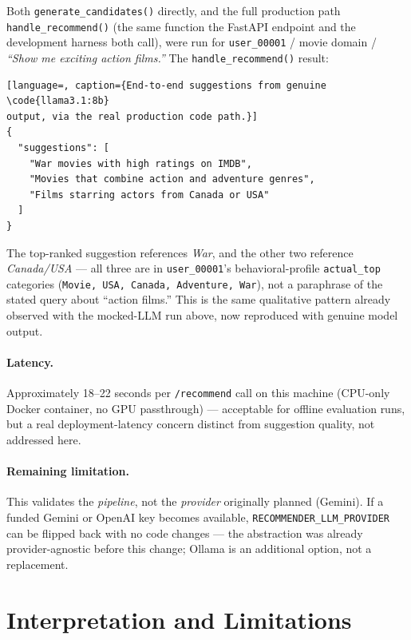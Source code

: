\documentclass[11pt,a4paper]{article}
\newcommand{\code}[1]{\texttt{#1}}
\begin{document}
Both \code{generate\_candidates()} directly, and the full production path
\code{handle\_recommend()} (the same function the FastAPI endpoint and the development harness both
call), were run for \code{user\_00001} / movie domain / \emph{``Show me exciting action films.''}
The \code{handle\_recommend()} result:

\begin{lstlisting}[language=, caption={End-to-end suggestions from genuine \code{llama3.1:8b}
output, via the real production code path.}]
{
  "suggestions": [
    "War movies with high ratings on IMDB",
    "Movies that combine action and adventure genres",
    "Films starring actors from Canada or USA"
  ]
}
\end{lstlisting}

The top-ranked suggestion references \emph{War}, and the other two reference \emph{Canada/USA} ---
all three are in \code{user\_00001}'s behavioral-profile \code{actual\_top} categories (\code{Movie,
USA, Canada, Adventure, War}), not a paraphrase of the stated query about ``action films.'' This is
the same qualitative pattern already observed with the mocked-LLM run above, now reproduced with
genuine model output.

\paragraph{Latency.} Approximately 18--22 seconds per \code{/recommend} call on this machine
(CPU-only Docker container, no GPU passthrough) --- acceptable for offline evaluation runs, but a
real deployment-latency concern distinct from suggestion quality, not addressed here.

\paragraph{Remaining limitation.} This validates the \emph{pipeline}, not the \emph{provider}
originally planned (Gemini). If a funded Gemini or OpenAI key becomes available,
\code{RECOMMENDER\_LLM\_PROVIDER} can be flipped back with no code changes --- the abstraction was
already provider-agnostic before this change; Ollama is an additional option, not a replacement.

\section{Interpretation and Limitations}
\end{document}
